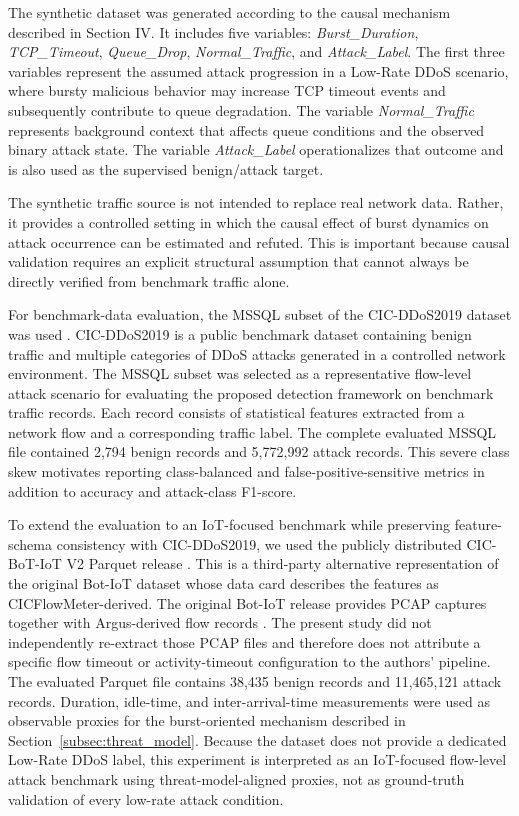 \documentclass[journal]{IEEEtran}
\begin{document}
The synthetic dataset was generated according to the causal mechanism described in Section IV. It includes five variables: \textit{Burst\_Duration}, \textit{TCP\_Timeout}, \textit{Queue\_Drop}, \textit{Normal\_Traffic}, and \textit{Attack\_Label}. The first three variables represent the assumed attack progression in a Low-Rate DDoS scenario, where bursty malicious behavior may increase TCP timeout events and subsequently contribute to queue degradation. The variable \textit{Normal\_Traffic} represents background context that affects queue conditions and the observed binary attack state. The variable \textit{Attack\_Label} operationalizes that outcome and is also used as the supervised benign/attack target.

The synthetic traffic source is not intended to replace real network data. Rather, it provides a controlled setting in which the causal effect of burst dynamics on attack occurrence can be estimated and refuted. This is important because causal validation requires an explicit structural assumption that cannot always be directly verified from benchmark traffic alone.

For benchmark-data evaluation, the MSSQL subset of the CIC-DDoS2019 dataset was used \cite{sharafaldin2019cicddos}. CIC-DDoS2019 is a public benchmark dataset containing benign traffic and multiple categories of DDoS attacks generated in a controlled network environment. The MSSQL subset was selected as a representative flow-level attack scenario for evaluating the proposed detection framework on benchmark traffic records. Each record consists of statistical features extracted from a network flow and a corresponding traffic label.
The complete evaluated MSSQL file contained 2,794 benign records and
5,772,992 attack records. This severe class skew motivates reporting
class-balanced and false-positive-sensitive metrics in addition to accuracy
and attack-class F1-score.

To extend the evaluation to an IoT-focused benchmark while preserving
feature-schema consistency with CIC-DDoS2019, we used the publicly distributed
CIC-BoT-IoT V2 Parquet release \cite{dhooge2026cicbotiot}. This is a
third-party alternative representation of the original Bot-IoT dataset whose
data card describes the features as CICFlowMeter-derived. The original
Bot-IoT release provides PCAP captures together with Argus-derived flow
records \cite{koroniotis2019botiot}. The present study did not independently
re-extract those PCAP files and therefore does not attribute a specific flow
timeout or activity-timeout configuration to the authors' pipeline. The
evaluated Parquet file contains 38,435 benign records and 11,465,121 attack
records. Duration, idle-time, and inter-arrival-time measurements were used as
observable proxies for the burst-oriented mechanism described in
Section~\ref{subsec:threat_model}. Because the dataset does not provide a
dedicated Low-Rate DDoS label, this experiment is interpreted as an
IoT-focused flow-level attack benchmark using threat-model-aligned proxies,
not as ground-truth validation of every low-rate attack condition.
\end{document}
